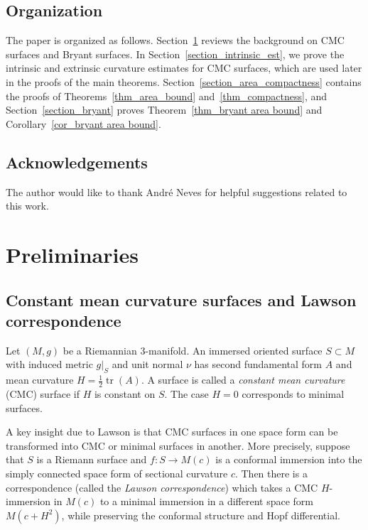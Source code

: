 \documentclass[12pt,a4paper]{amsart}
\numberwithin{equation}{section}
\theoremstyle{plain}
\theoremstyle{named}
\theoremstyle{definition}
\begin{document}
\subsection{Organization}
The paper is organized as follows. Section~\ref{section_preliminary} reviews the background on CMC surfaces and Bryant surfaces. In Section~\ref{section_intrinsic_est}, we prove the intrinsic and extrinsic curvature estimates for CMC surfaces, which are used later in the proofs of the main theorems. Section~\ref{section_area_compactness} contains the proofs of Theorems~\ref{thm_area_bound} and~\ref{thm_compactness}, and Section~\ref{section_bryant} proves Theorem~\ref{thm_bryant area bound} and Corollary~\ref{cor_bryant area bound}.

\subsection*{Acknowledgements}
The author would like to thank Andr\'{e} Neves for helpful suggestions related to this work. 



\section{Preliminaries}\label{section_preliminary}
\subsection{Constant mean curvature surfaces and Lawson correspondence}

Let $(M,g)$ be a Riemannian $3$-manifold. An immersed oriented surface $S\subset M$ with induced metric $g|_S$ and unit normal $\nu$ has second fundamental form $A$ and mean curvature $H = \frac{1}{2}\operatorname{tr}(A)$. A surface is called a \emph{constant mean curvature} (CMC) surface if $H$ is constant on $S$. The case $H=0$ corresponds to minimal surfaces.

A key insight due to Lawson \cite{Lawson1970} is that CMC surfaces in one space form can be transformed into CMC or minimal surfaces in another. More precisely, suppose that $S$ is a Riemann surface and $f:S \to M(c)$ is a conformal immersion into the simply connected space form of sectional curvature $c$. Then there is a correspondence (called the \emph{Lawson correspondence}) which takes a CMC $H$-immersion in $M(c)$ to a minimal immersion in a different space form $M(c+H^2)$, while preserving the conformal structure and Hopf differential.  
\end{document}
